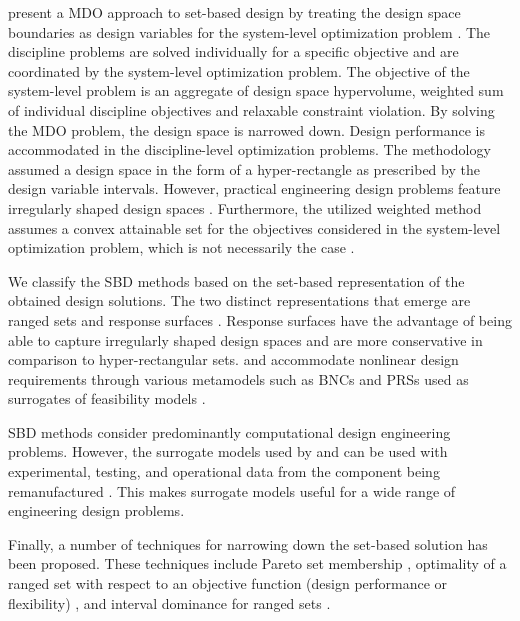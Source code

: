 \citeauthor{Hannapel2014} present a \ac{MDO} approach to set-based design by treating the design space boundaries as design variables for the system-level optimization problem \cite{Hannapel2014}. The discipline problems are solved individually for a specific objective and are coordinated by the system-level optimization problem. The objective of the system-level problem is an aggregate of design space hypervolume, weighted sum of individual discipline objectives and relaxable constraint violation. By solving the \ac{MDO} problem, the design space is narrowed down. Design performance is accommodated in the discipline-level optimization problems. The methodology assumed a design space in the form of a hyper-rectangle as prescribed by the design variable intervals. However, practical engineering design problems feature irregularly shaped design spaces \cite{Shahan2012}. Furthermore, the utilized weighted method assumes a convex attainable set for the objectives considered in the system-level optimization problem, which is not necessarily the case \cite{WardAthan1996}.

We classify the \ac{SBD} methods based on the set-based representation of the obtained design solutions. The two distinct representations that emerge are ranged sets \cite{Qureshi2014,Nahm2005,Olewnik2004,Liu2008,Suh2007} and response surfaces \cite{Kizer2014,Shahan2012,Yannou2003,Ge2005}. Response surfaces have the advantage of being able to capture irregularly shaped design spaces and are more conservative in comparison to hyper-rectangular sets. \citeauthor{Shahan2012} and \citeauthor{Yannou2003} accommodate nonlinear design requirements through various metamodels such as \acp{BNC} and \acp{PRS} used as surrogates of feasibility models \cite{Shahan2012,Yannou2003}.

\ac{SBD} methods consider predominantly computational design engineering problems. However, the surrogate models used by \citeauthor{Shahan2012} and \citeauthor{Yannou2003} can be used with experimental, testing, and operational data from the component being remanufactured \cite{Shahan2012,Yannou2003}. This makes surrogate models useful for a wide range of engineering design problems.

Finally, a number of techniques for narrowing down the set-based solution has been proposed. These techniques include Pareto set membership \cite{Olewnik2004,Miller2018}, optimality of a ranged set with respect to an objective function (design performance or flexibility) \cite{Hannapel2014,Liu2008,Suh2007}, and interval dominance for ranged sets \cite{Malak2009,Miller2018}.


